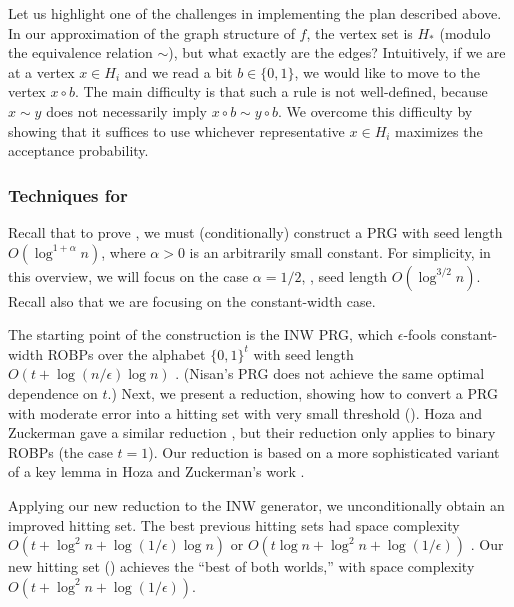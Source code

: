 \documentclass{toc}
\begin{document}
Let us highlight one of the challenges in implementing the plan described above. In our approximation of the graph structure of $f$, the vertex set is $H_*$ (modulo the equivalence relation $\sim$), but what exactly are the edges? Intuitively, if we are at a vertex $x \in H_i$ and we read a bit $b \in \{0, 1\}$, we would like to move to the vertex $x \circ b$. The main difficulty is that such a rule is not well-defined, because $x \sim y$ does not necessarily imply $x \circ b \sim y \circ b$. We overcome this difficulty by showing that it suffices to use whichever representative $x \in H_i$ maximizes the acceptance probability.

\subsubsection{Techniques for } \label{sec:negative-techniques}

Recall that to prove , we must (conditionally) construct a PRG with seed length $O(\log^{1 + \alpha} n)$, where $\alpha > 0$ is an arbitrarily small constant. For simplicity, in this overview, we will focus on the case $\alpha = 1/2$, \ie, seed length $O(\log^{3/2} n)$. Recall also that we are focusing on the constant-width case. 

The starting point of the construction is the INW PRG, which $\epsilon$-fools constant-width ROBPs over the alphabet $\{0, 1\}^t$ with seed length $O(t + \log(n/\epsilon) \log n)$ \cite{INW94}. (Nisan's PRG \cite{Nis92} does not achieve the same optimal dependence on $t$.) Next, we present a reduction, showing how to convert a PRG with moderate error into a hitting set with very small threshold (). Hoza and Zuckerman gave a similar reduction \cite{HZ20}, but their reduction only applies to binary ROBPs (the case $t = 1$). Our reduction is based on a more sophisticated variant of a key lemma in Hoza and Zuckerman's work \cite{HZ20}.

Applying our new reduction to the INW generator, we unconditionally obtain an improved hitting set. The best previous hitting sets had space complexity $O(t + \log^2 n + \log(1/\epsilon) \log n)$ \cite{INW94} or $O(t \log n + \log^2 n + \log(1/\epsilon))$ \cite{HZ20}. Our new hitting set () achieves the ``best of both worlds,'' with space complexity $O(t + \log^2 n + \log(1/\epsilon))$.
\end{document}
